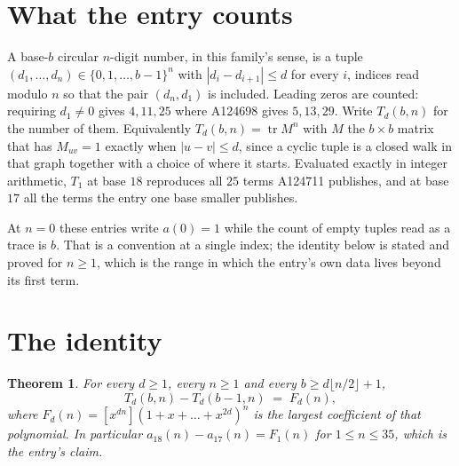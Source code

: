 \documentclass[11pt,a4paper]{article}
\theoremstyle{plain}
\newtheorem{theorem}{Theorem}
\theoremstyle{definition}
\begin{document}
\section{What the entry counts}

A base-$b$ circular $n$-digit number, in this family's sense, is a tuple
$(d_1,\dots,d_n)\in\{0,1,\dots,b-1\}^{n}$ with $|d_i-d_{i+1}|\le d$ for every $i$, indices
read modulo $n$ so that the pair $(d_n,d_1)$ is included. Leading zeros are counted: requiring
$d_1\ne0$ gives $4,11,25$ where A124698 gives $5,13,29$. Write $T_d(b,n)$ for the number of
them. Equivalently $T_d(b,n)=\operatorname{tr}M^{n}$ with $M$ the $b\times b$ matrix that has
$M_{uv}=1$ exactly when $|u-v|\le d$, since a cyclic tuple is a closed walk in that graph
together with a choice of where it starts. Evaluated exactly in integer arithmetic, $T_{1}$
at base $18$ reproduces all $25$ terms A124711 publishes, and at base $17$ all the
terms the entry one base smaller publishes.

At $n=0$ these entries write $a(0)=1$ while the count of empty tuples read as a trace is $b$.
That is a convention at a single index; the identity below is stated and proved for $n\ge1$,
which is the range in which the entry's own data lives beyond its first term.

\section{The identity}

\begin{theorem}
For every $d\ge1$, every $n\ge1$ and every $b\ge d\lfloor n/2\rfloor+1$,
\[
T_d(b,n)-T_d(b-1,n)\;=\;F_d(n),
\]
where $F_d(n)=[x^{dn}](1+x+\dots+x^{2d})^{n}$ is the largest coefficient of that
polynomial. In particular $a_{18}(n)-a_{17}(n)=F_{1}(n)$ for $1\le n\le35$, which
is the entry's claim.
\end{theorem}
\end{document}
